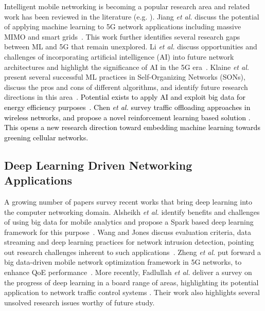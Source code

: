 \documentclass[journal,comsoc,letter]{IEEEtran}
\newcommand{\edit}[1]{\textcolor{black}{#1}}
\begin{document}
Intelligent mobile networking is becoming a popular research area and related work has been reviewed in the literature (e.g. \cite{jiang2017machine, buda2016can, keshavamurthy2016conceptual, alsheikh2014machine, li2017intelligent, bkassiny2013survey, bui2017survey, valente2017survey}). Jiang \emph{et al.} discuss the potential of applying machine learning to 5G network applications including massive MIMO and smart grids~\cite{jiang2017machine}. This work further identifies several research gaps between ML and 5G that remain unexplored. Li \emph{et al.} discuss opportunities and challenges of incorporating artificial intelligence (AI) into future network architectures and highlight the significance of AI in the 5G era~\cite{li2017intelligent}. Klaine \emph{et al.} present several successful ML practices in Self-Organizing Networks (SONs), discuss the pros and cons of different algorithms, and identify future research directions in this area~\cite{valente2017survey}. \edit{Potential exists to apply AI and exploit big data for energy efficiency purposes~\cite{wu2016big}. Chen \emph{et al.} survey traffic offloading approaches in wireless networks, and propose a novel reinforcement learning based solution \cite{chen2015energy}. This opens a new research direction toward embedding machine learning towards greening cellular networks.}

\subsection{Deep Learning Driven Networking Applications}
A growing number of papers survey recent works that bring deep learning into the computer networking domain. 
Alsheikh \emph{et al.} identify benefits and challenges of using big data for mobile analytics and propose a Spark based deep learning framework for this purpose~\cite{alsheikh2016mobile}. Wang and Jones discuss evaluation criteria, data streaming and deep learning practices for network intrusion detection, pointing out research challenges inherent to such  applications~\cite{wang2017big}. Zheng \emph{et al.} put forward a big data-driven mobile network optimization framework in 5G networks, to enhance QoE performance~\cite{zheng2016big}. More recently, Fadlullah \emph{et al.} deliver a survey on the progress of deep learning in a board range of areas, highlighting its potential application to network traffic control systems \cite{fadlullah2017state}. Their work also highlights several unsolved research issues worthy of future study. 
\end{document}
